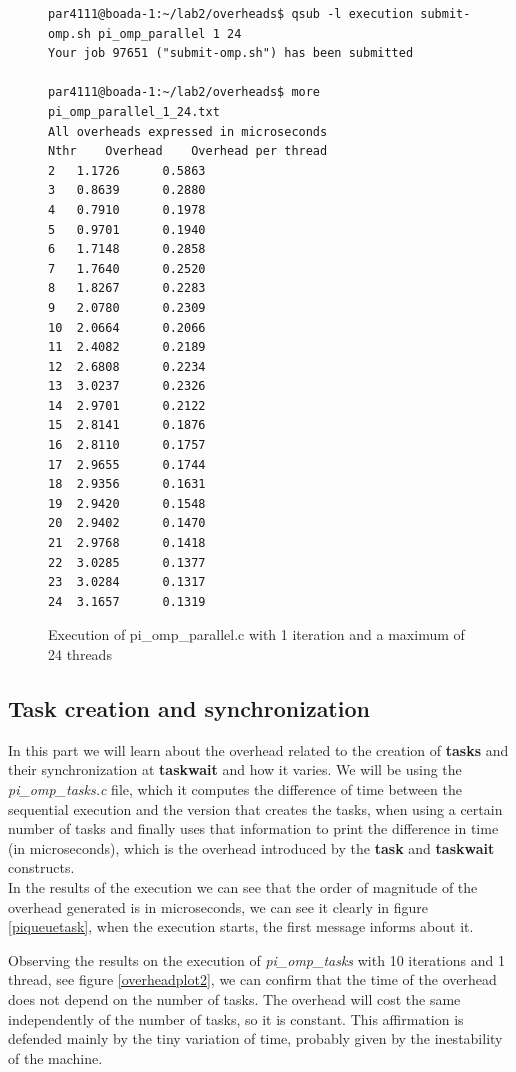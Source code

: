 \documentclass[12]{article}
\begin{document}
\begin{figure}[H]
\begin{lstlisting}[frame=single]
par4111@boada-1:~/lab2/overheads$ qsub -l execution submit-omp.sh pi_omp_parallel 1 24
Your job 97651 ("submit-omp.sh") has been submitted

par4111@boada-1:~/lab2/overheads$ more pi_omp_parallel_1_24.txt 
All overheads expressed in microseconds
Nthr	Overhead	Overhead per thread
2	1.1726		0.5863
3	0.8639		0.2880
4	0.7910		0.1978
5	0.9701		0.1940
6	1.7148		0.2858
7	1.7640		0.2520
8	1.8267		0.2283
9	2.0780		0.2309
10	2.0664		0.2066
11	2.4082		0.2189
12	2.6808		0.2234
13	3.0237		0.2326
14	2.9701		0.2122
15	2.8141		0.1876
16	2.8110		0.1757
17	2.9655		0.1744
18	2.9356		0.1631
19	2.9420		0.1548
20	2.9402		0.1470
21	2.9768		0.1418
22	3.0285		0.1377
23	3.0284		0.1317
24	3.1657		0.1319

\end{lstlisting}
\caption{Execution of pi\_omp\_parallel.c with 1 iteration and a maximum of 24 threads}
\label{piqueue}
\end{figure}
\subsection{Task creation and synchronization}
In this part we will learn about the overhead related to the creation of \textbf{tasks} and their synchronization at \textbf{taskwait} and how it varies. We will be using the \textit{pi\_omp\_tasks.c} file, which it computes the difference of time between the sequential execution and the version that creates the tasks, when using a certain number of tasks and finally uses that information to print the difference in time (in microseconds), which is the overhead introduced by the \textbf{task} and \textbf{taskwait} constructs. 
\\
\medskip
In the results of the execution we can see that the order of magnitude of the overhead generated is in microseconds, we can see it clearly in figure \ref{piqueuetask}, when the 
execution starts, the first message informs about it. 
\\
\medskip

Observing the results on the execution of \textit{pi\_omp\_tasks} with 10 iterations and 1 thread, see figure \ref{overheadplot2}, we can confirm that the time of the overhead does not depend on the number of tasks. The overhead will cost the same independently of the number of tasks, so it is constant. This affirmation is defended mainly by the tiny variation of time, probably given by the inestability of the machine. 
\\
\bigskip
\end{document}
